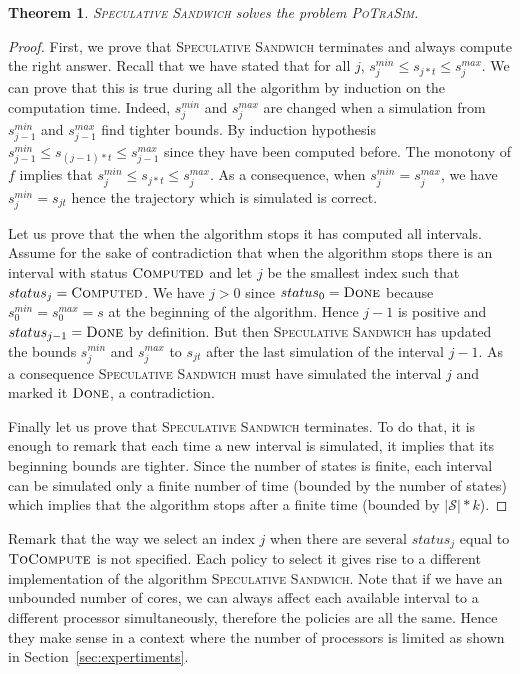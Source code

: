 \documentclass[a4paper,10pt]{article}
\newcommand{\cS}{\mathcal{S}}
\newtheorem{theorem}{Theorem}
\begin{document}
 \begin{theorem}\label{th:alg_ok}
  \textsc{Speculative Sandwich} solves the problem \textsc{PoTraSim}. 
  \end{theorem}
  
\begin{proof}
First, we prove that \textsc{Speculative Sandwich} terminates and always compute the right answer.
Recall that we have stated that for all $j$, $s_j^{min} \leq s_{j*t} \leq s_j^{max}$. We can prove that 
this is true during all the algorithm by induction on the computation time. Indeed, $s_j^{min}$ and $s_j^{max}$ are changed when a simulation from $s_{j-1}^{min}$ and $s_{j-1}^{max}$ find tighter bounds. By induction hypothesis $s_{j-1}^{min} \leq s_{(j-1)*t} \leq s_{j-1}^{max}$ since they have been computed before. The monotony of $f$ implies that $s_j^{min} \leq s_{j*t} \leq s_j^{max}$. As a consequence, when $s_j^{min} = s_j^{max}$, we have $s_j^{min} = s_{jt}$ hence the trajectory which is simulated is correct. 

Let us prove that the when the algorithm stops it has computed all intervals. Assume for the sake of contradiction that when the algorithm stops there is an interval with status $\textsc{Computed}$ and let 
$j$ be the smallest index such that $status_j = \textsc{Computed}$. We have $j>0$ since $status_0 = \textsc{Done}$ because $s_0^{min} = s_0^{max} = s$ at the beginning of the algorithm. Hence $j-1$ is positive and $status_{j-1} = \textsc{Done}$ by definition. But then \textsc{Speculative Sandwich} has updated the bounds $s_j^{min}$ and $s_j^{max}$ to $s_{jt}$ after the last simulation of the interval $j-1$. As a consequence \textsc{Speculative Sandwich} must have simulated the interval $j$ and marked it $\textsc{Done}$, a contradiction.

Finally let us prove that \textsc{Speculative Sandwich} terminates. 
To do that, it is enough to remark that each time a new interval is simulated,
it implies that its beginning bounds are tighter. Since the number of states is finite,
each interval can be simulated only a finite number of time (bounded by the number of states) which  implies 
that the algorithm stops after a finite time (bounded by $|\cS|*k$).
\end{proof}


Remark that the way we select an index $j$ when there are several $status_j$ equal to $\textsc{ToCompute}$ is not specified. Each policy to select it gives rise to a different implementation of the algorithm \textsc{Speculative Sandwich}. Note that if we have an unbounded number of cores, we can always affect each available interval to a different processor simultaneously, therefore the policies are all the same. Hence they make sense in a context where the number of processors is limited as shown in Section~\ref{sec:expertiments}.
\end{document}
